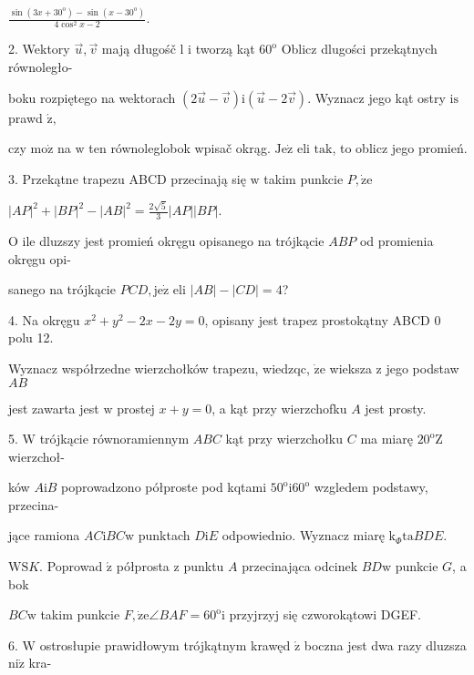 \documentclass[a4paper,12pt]{article}
\begin{document}
$\displaystyle \frac{\sin(3x+30^{\mathrm{o}})-\sin(x-30^{\mathrm{o}})}{4\cos^{2}x-2}.$

2. Wektory $\vec{u}, \vec{v}$ mają długośč l $\mathrm{i}$ tworzą kąt $60^{\mathrm{o}}$ Oblicz dlugości przekątnych równoległo-

boku rozpiętego na wektorach $(2\vec{u}-\vec{v})\mathrm{i}(\vec{u}-2\vec{v})$. Wyznacz jego kąt ostry $\mathrm{i}\mathrm{s}$prawd $\acute{\mathrm{z}},$

czy $\mathrm{m}\mathrm{o}\dot{\mathrm{z}}$ na $\mathrm{w}$ ten równoleglobok wpisač okrąg. $\mathrm{J}\mathrm{e}\dot{\mathrm{z}}$ eli $\mathrm{t}\mathrm{a}\mathrm{k}$, to oblicz jego promień.

3. Przekątne trapezu ABCD przecinają się $\mathrm{w}$ takim punkcie $P, \dot{\mathrm{z}}\mathrm{e}$

$|AP|^{2}+|BP|^{2}-|AB|^{2}=\displaystyle \frac{2\sqrt{5}}{3}|AP||BP|.$

$\mathrm{O}$ ile dluzszy jest promień okręgu opisanego na trójkącie $ABP$ od promienia okręgu opi-

sanego na trójkącie $PCD, \mathrm{j}\mathrm{e}\dot{\mathrm{z}}$ eli $|AB|-|CD|=4$?

4. Na okręgu $x^{2}+y^{2}-2x-2y=0$, opisany jest trapez prostokątny ABCD $0$ polu 12.

Wyznacz współrzedne wierzchołków trapezu, wiedzqc, $\dot{\mathrm{z}}\mathrm{e}$ wieksza $\mathrm{z}$ jego podstaw $AB$

jest zawarta jest $\mathrm{w}$ prostej $x+y=0$, a kąt przy wierzchofku $A$ jest prosty.

5. $\mathrm{W}$ trójkącie równoramiennym $ABC$ kąt przy wierzchołku $C$ ma miarę $20^{\mathrm{o}} \mathrm{Z}$ wierzchoł-

ków $A\mathrm{i}B$ poprowadzono półproste pod kqtami $50^{\mathrm{o}}\mathrm{i}60^{\mathrm{o}}$ wzgledem podstawy, przecina-

jące ramiona $AC\mathrm{i}BC\mathrm{w}$ punktach $D\mathrm{i}E$ odpowiednio. Wyznacz miarę $\mathrm{k}_{\Phi}\mathrm{t}\mathrm{a}BDE.$

$\mathrm{W}\mathrm{S}K.$ Poprowad $\acute{\mathrm{z}}$ półprosta $\mathrm{z}$ punktu $A$ przecinająca odcinek $BD\mathrm{w}$ punkcie $G$, a bok

$BC\mathrm{w}$ takim punkcie $F, \dot{\mathrm{z}}\mathrm{e}\angle BAF=60^{\mathrm{o}}\mathrm{i}$ przyjrzyj się czworokątowi DGEF.

6. $\mathrm{W}$ ostrosłupie prawidłowym trójkątnym krawęd $\acute{\mathrm{z}}$ boczna jest dwa razy dluzsza $\mathrm{n}\mathrm{i}\dot{\mathrm{z}}$ kra-
\end{document}
